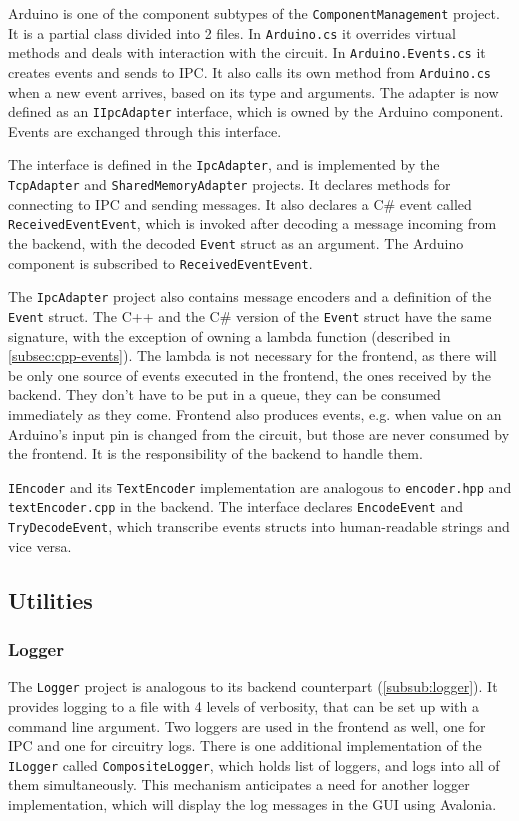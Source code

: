 Arduino is one of the component subtypes of the \texttt{ComponentManagement} project. It is a partial class divided into 2 files. In \texttt{Arduino.cs} it overrides virtual methods and deals with interaction with the circuit. In \texttt{Arduino.Events.cs} it creates events and sends to IPC. It also calls its own method from \texttt{Arduino.cs} when a new event arrives, based on its type and arguments. The adapter is now defined as an \texttt{IIpcAdapter} interface, which is owned by the Arduino component. Events are exchanged through this interface.

The interface is defined in the \texttt{IpcAdapter}, and is implemented by the \texttt{TcpAdapter} and \texttt{SharedMemoryAdapter} projects. It declares methods for connecting to IPC and sending messages. It also declares a C\# event called \texttt{ReceivedEventEvent}, which is invoked after decoding a message incoming from the backend, with the decoded \texttt{Event} struct as an argument. The Arduino component is subscribed to \texttt{ReceivedEventEvent}.

The \texttt{IpcAdapter} project also contains message encoders and a definition of the \texttt{Event} struct. The C++ and the C\# version of the \texttt{Event} struct have the same signature, with the exception of owning a lambda function (described in \ref{subsec:cpp-events}). The lambda is not necessary for the frontend, as there will be only one source of events executed in the frontend, the ones received by the backend. They don't have to be put in a queue, they can be consumed immediately as they come. Frontend also produces events, e.g. when value on an Arduino's input pin is changed from the circuit, but those are never consumed by the frontend. It is the responsibility of the backend to handle them.

\texttt{IEncoder} and its \texttt{TextEncoder} implementation are analogous to \texttt{encoder.hpp} and \texttt{textEncoder.cpp} in the backend. The interface declares \texttt{EncodeEvent} and \texttt{TryDecodeEvent}, which transcribe events structs into human-readable strings and vice versa.

\subsection{Utilities}

\subsubsection{Logger}

The \texttt{Logger} project is analogous to its backend counterpart (\ref{subsub:logger}). It provides logging to a file with 4 levels of verbosity, that can be set up with a command line argument. Two loggers are used in the frontend as well, one for IPC and one for circuitry logs. There is one additional implementation of the \texttt{ILogger} called \texttt{CompositeLogger}, which holds list of loggers, and logs into all of them simultaneously. This mechanism anticipates a need for another logger implementation, which will display the log messages in the GUI using Avalonia.